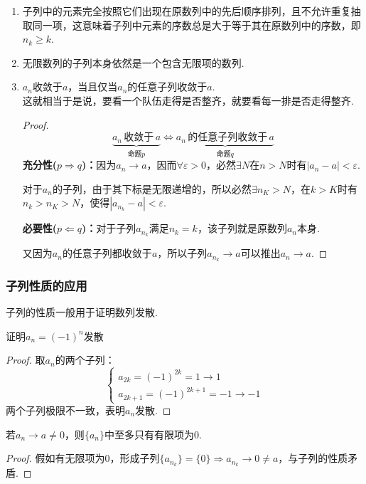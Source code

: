 \begin{enumerate}[property]
    \item 子列中的元素完全按照它们出现在原数列中的先后顺序排列，且不允许重复抽取同一项，这意味着子列中元素的序数总是大于等于其在原数列中的序数，即$n_k \geqslant k$.
    \item 无限数列的子列本身依然是一个包含无限项的数列.
    \item $a_n$收敛于$a$，当且仅当$a_n$的任意子列收敛于$a$.\\
    这就相当于是说，要看一个队伍走得是否整齐，就要看每一排是否走得整齐.
    \begin{proof}
    \[\underbrace{a_n\,\text{收敛于}\,a}_\text{命题$p$} \Leftrightarrow \underbrace{a_n\,\text{的任意子列收敛于}\,a}_\text{命题$q$}\]
    \textbf{充分性($p \Rightarrow q$)：}因为$a_n \to a$，因而$\forall \varepsilon > 0$，必然$\exists N$在$n>N$时有$|a_n - a|<\varepsilon$.

    对于$a_n$的子列，由于其下标是无限递增的，所以必然$\exists n_K > N$，在$k > K$时有$n_k > n_K > N$，使得$|a_{n_k} - a| < \varepsilon$.

    \textbf{必要性($p \Leftarrow q$)：}对于子列$a_{n_k}$满足$n_k = k$，该子列就是原数列$a_n$本身.

    又因为$a_n$的任意子列都收敛于$a$，所以子列$a_{n_k} \to a$可以推出$a_n \to a$.
    \end{proof}
\end{enumerate}


\subsubsection{子列性质的应用}
子列的性质一般用于证明数列发散.
\begin{question}
    证明$a_n = (-1)^n$发散
\end{question}
\begin{proof}
    取$a_n$的两个子列：
    \[\begin{cases}
        a_{2k} = (-1)^{2k} = 1 \to 1 \\
        a_{2k+1} = (-1)^{2k+1} = -1 \to -1
    \end{cases}\]
    两个子列极限不一致，表明$a_n$发散.
\end{proof}

\begin{proposition}
    若$a_n \to a \neq 0$，则$\{a_n\}$中至多只有有限项为$0$.
\end{proposition}
\begin{proof}
    假如有无限项为$0$，形成子列$\{a_{n_k}\}=\{0\}\Rightarrow a_{n_k} \to 0 \neq a$，与子列的性质矛盾.
\end{proof}

